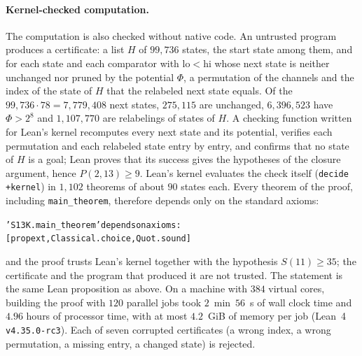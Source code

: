 
\paragraph{Kernel-checked computation.}
The computation is also checked without native code. An untrusted program produces a certificate: a
list $H$ of $99{,}736$ states, the start state among them, and for each state and each comparator with
$\mathrm{lo}<\mathrm{hi}$ whose next state is neither unchanged nor pruned by the potential $\Phi$, a
permutation of the channels and the index of the state of $H$ that the relabeled next state equals.
Of the $99{,}736\cdot78=7{,}779{,}408$ next states, $275{,}115$ are unchanged, $6{,}396{,}523$ have
$\Phi>2^8$ and $1{,}107{,}770$ are relabelings of states of $H$. A checking function written for Lean's
kernel recomputes every next state and its potential, verifies each permutation and each relabeled
state entry by entry, and confirms that no state of $H$ is a goal; Lean proves that its success gives
the hypotheses of the closure argument, hence $P(2,13)\ge9$. Lean's kernel evaluates the check itself
(\texttt{decide +kernel}) in $1{,}102$ theorems of about $90$ states each. Every theorem of the proof,
including \texttt{main\_theorem}, therefore depends only on the standard axioms:
\begin{alltt}\small
'S13K.main_theorem' depends on axioms: [propext, Classical.choice, Quot.sound]
\end{alltt}
and the proof trusts Lean's kernel together with the hypothesis $S(11)\ge35$; the certificate and the
program that produced it are not trusted. The statement is the same Lean proposition as above. On a
machine with $384$ virtual cores, building the proof with $120$ parallel jobs took $2$~min~$56$~s of wall
clock time and $4.96$ hours of processor time, with at most $4.2$~GiB of memory per job (Lean~4
\texttt{v4.35.0-rc3}). Each of seven corrupted certificates (a wrong index, a wrong permutation, a missing
entry, a changed state) is rejected.
